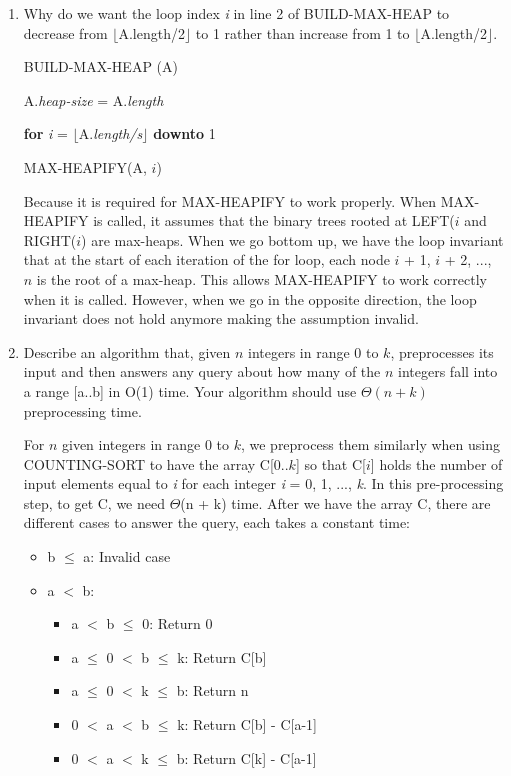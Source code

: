 \documentclass[11pts]{report}
\begin{document}
\begin{enumerate}
\item Why do we want the loop index \textit{i} in line 2 of BUILD-MAX-HEAP to decrease from $\lfloor$A.length/2$\rfloor$ to 1 rather than increase from 1 to $\lfloor$A.length/2$\rfloor$.

\par BUILD-MAX-HEAP (A)
\par A.\textit{heap-size} = A.\textit{length}
\par \textbf{for} \textit{i} = $\lfloor$A.\textit{length/s}$\rfloor$ \textbf{downto} 1
\par \quad \quad MAX-HEAPIFY(A, $i$)

\par Because it is required for MAX-HEAPIFY to work properly. When MAX-HEAPIFY is called, it assumes that the binary trees rooted at LEFT($i$ and RIGHT($i$) are max-heaps. When we go bottom up, we have the loop invariant that at the start of each iteration of the for loop, each node $i$ + 1, $i$ + 2, ..., $n$ is the root of a max-heap. This allows MAX-HEAPIFY to work correctly when it is called. However, when we go in the opposite direction, the loop invariant does not hold anymore making the assumption invalid.
\item Describe an algorithm that, given $n$ integers in range 0 to $k$, preprocesses its input and then answers any query about how many of the $n$ integers fall into a range [a..b] in O(1) time. Your algorithm should use $\Theta(n + k)$ preprocessing time.

\par For $n$ given integers in range 0 to $k$, we preprocess them similarly when using COUNTING-SORT to have the array C[0..$k$] so that C[$i$] holds the number of input elements equal to \textit{i} for each integer \textit{i} = 0, 1, ..., \textit{k}. In this pre-processing step, to get C, we need $\Theta$(n + k) time. After we have the array C, there are different cases to answer the query, each takes a constant time:

\begin{itemize}
\item b $\leq$ a: Invalid case
\item a $<$ b:
	\begin{itemize}
	\item a $<$ b $\leq$ 0: Return 0
	\item a $\leq$ 0 $<$ b $\leq$ k: Return C[b]
	\item a $\leq$ 0 $<$ k $\leq$ b: Return n
	\item 0 $<$ a $<$ b $\leq$ k: Return C[b] - C[a-1]
	\item 0 $<$ a $<$ k $\leq$ b: Return C[k] - C[a-1]
	\end{itemize}
\end{itemize}


\end{enumerate}
\end{document}
